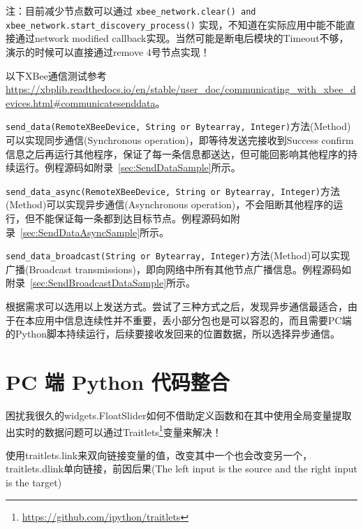 注：目前减少节点数可以通过 \texttt{xbee_network.clear() and xbee_network.start_discovery_process()} 实现，不知道在实际应用中能不能直接通过network modified callback实现。当然可能是断电后模块的Timeout不够，演示的时候可以直接通过remove 4号节点实现！

以下XBee通信测试参考\url{https://xbplib.readthedocs.io/en/stable/user_doc/communicating_with_xbee_devices.html#communicatesenddata}。

\texttt{send_data(RemoteXBeeDevice, String or Bytearray, Integer)}方法(Method)可以实现同步通信(Synchronous operation)，即等待发送完接收到Success confirm信息之后再运行其他程序，保证了每一条信息都送达，但可能回影响其他程序的持续运行。例程源码如附录~\ref{sec:SendDataSample}所示。

\texttt{send_data_async(RemoteXBeeDevice, String or Bytearray, Integer)}方法(Method)可以实现异步通信(Asynchronous operation)，不会阻断其他程序的运行，但不能保证每一条都到达目标节点。例程源码如附录~\ref{sec:SendDataAsyncSample}所示。

\texttt{send_data_broadcast(String or Bytearray, Integer)}方法(Method)可以实现广播(Broadcast transmissions)，即向网络中所有其他节点广播信息。例程源码如附录~\ref{sec:SendBroadcastDataSample}所示。

根据需求可以选用以上发送方式。尝试了三种方式之后，发现异步通信最适合，由于在本应用中信息连续性并不重要，丢小部分包也是可以容忍的，而且需要PC端的Python脚本持续运行，后续要接收发回来的位置数据，所以选择异步通信。



\section{PC 端 Python 代码整合}

困扰我很久的widgets.FloatSlider如何不借助定义函数和在其中使用全局变量提取出实时的数据问题可以通过Traitlets\footnote{\url{https://github.com/ipython/traitlets}}变量来解决！

使用traitlets.link来双向链接变量的值，改变其中一个也会改变另一个，traitlets.dlink单向链接，前因后果(The left input is the source and the right input is the target)